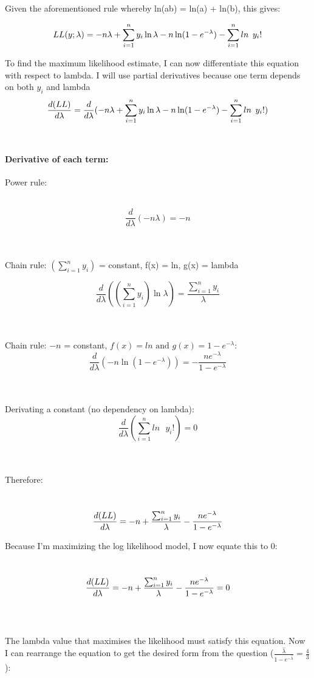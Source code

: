 \documentclass[
]{article}
\begin{document}
Given the aforementioned rule whereby ln(ab) = ln(a) + ln(b), this
gives:

\[
\Large
LL(y; \lambda) = -n\lambda +  \sum_{i=1}^n y_i \ln \lambda - n \ln (1 - e^{-\lambda}) - \sum_{i=1}^n ln\text{ }y_i!
\]

To find the maximum likelihood estimate, I can now differentiate this
equation with respect to lambda. I will use partial derivatives because
one term depends on both \(y_i\) and lambda \[
\Large
\frac{d(LL) }{d\lambda}=\frac{d }{d\lambda}(-n\lambda +  \sum_{i=1}^n y_i \ln \lambda - n \ln (1 - e^{-\lambda}) - \sum_{i=1}^n ln\text{ }y_i!)
\]\\

\paragraph{Derivative of each term:}\label{derivative-of-each-term}

Power rule:\\
\strut \\
\[
\frac{d }{d\lambda}(-n\lambda) = -n
\]\\
\strut \\
Chain rule: \(\left( \sum_{i=1}^n y_i \right)\) = constant, f(x) = ln,
g(x) = lambda

\[
\frac{d }{d\lambda}(\left( \sum_{i=1}^n y_i \right) \ln \lambda) = \frac{\sum_{i=1}^n y_i}{\lambda}
\]\\
\strut \\
Chain rule: \(-n\) = constant,
\(f(x) = ln \text{ and } g(x) = 1-e^{-\lambda}\):\\

\[
\frac{d }{d\lambda}(- n \ln (1 - e^{-\lambda})) = -\frac{ne^{-\lambda}}{1-e^{-\lambda}}
\]\\
\strut \\
Derivating a constant (no dependency on lambda):\\

\[
\frac{d }{d\lambda}(\sum_{i=1}^n ln\text{ }y_i!) = 0
\]\\
\strut \\

Therefore:\\
\strut \\
\[
\Large
\frac{d(LL)}{d\lambda} = -n + \frac{\sum_{i=1}^n y_i}{\lambda}-\frac{ne^{-\lambda}}{1-e^{-\lambda}}
\]

Because I'm maximizing the log likelihood model, I now equate this to
0:\\
\strut \\
\[
\Large
\frac{d( LL)}{d\lambda} = -n + \frac{\sum_{i=1}^n y_i}{\lambda}-\frac{ne^{-\lambda}}{1-e^{-\lambda}} =0
\]\\
\strut \\
The lambda value that maximises the likelihood must satisfy this
equation. Now I can rearrange the equation to get the desired form from
the question
(\(\frac{\hat{\lambda}}{1-e^{-\hat{\lambda}}}= \frac{4}{3}\)):\\
\end{document}
